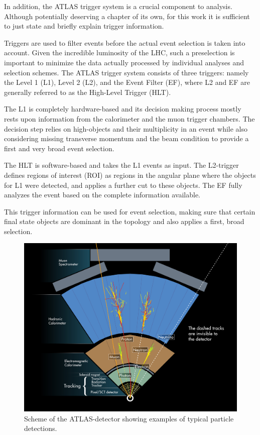 In addition, the ATLAS trigger system is a crucial component to analysis. Although potentially deserving a chapter of its own, for this work it is sufficient to just state  and briefly explain trigger information.

Triggers are used to filter events before the actual event selection is taken into account. Given the incredible luminosity of the LHC, such a preselection is important to minimize the data actually processed by individual analyses and selection schemes.
The ATLAS trigger system consists of three triggers: namely the Level 1 (L1), Level 2 (L2), and the Event Filter (EF), where L2 and EF are generally referred to as the High-Level Trigger (HLT).

The L1 is completely hardware-based and its decision making process mostly rests upon information from the calorimeter and the muon trigger chambers. The decision step relies on high-\pT objects and their multiplicity in an event while also considering missing transverse momentum and the beam condition to provide a first and very broad event selection.

The HLT is software-based and takes the L1 events as input. The L2-trigger defines regions of interest (ROI) as regions in the angular plane where the objects for L1 were detected, and applies a further cut to these objects.
The EF fully analyzes the event based on the complete information available.

This trigger information can be used for event selection, making sure that certain final state objects are dominant in the topology and also applies a first, broad selection.



\begin{figure}[htbp]
  \centering
  \includegraphics[scale=0.6]{figures_LHC/atlas-abstract}
  \caption[Scheme of the ATLAS-detector's detection procedure]{Scheme of the ATLAS-detector showing examples of typical particle detections. \cite{Pequenao:1095924}}
  \label{fig:atlas_sketch}
\end{figure}


